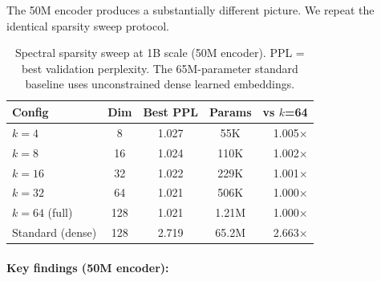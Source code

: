 \documentclass[10pt,twocolumn]{article}
\begin{document}
The 50M encoder produces a substantially different picture. We repeat the identical sparsity sweep protocol.

\begin{table}[t]
\centering
\caption{Spectral sparsity sweep at 1B scale (50M encoder). PPL = best validation perplexity. The 65M-parameter standard baseline uses unconstrained dense learned embeddings.}
\label{tab:1b_50m_sparsity}
\small
\begin{tabular}{@{}lcccr@{}}
\toprule
\textbf{Config} & \textbf{Dim} & \textbf{Best PPL} & \textbf{Params} & \textbf{vs $k$=64} \\
\midrule
$k = 4$            & 8   & 1.027 & 55K   & 1.005$\times$ \\
$k = 8$            & 16  & 1.024 & 110K  & 1.002$\times$ \\
$k = 16$           & 32  & 1.022 & 229K  & 1.001$\times$ \\
$k = 32$           & 64  & 1.021 & 506K  & 1.000$\times$ \\
$k = 64$ (full)    & 128 & 1.021 & 1.21M & 1.000$\times$ \\
\midrule
Standard (dense)   & 128 & 2.719 & 65.2M & 2.663$\times$ \\
\bottomrule
\end{tabular}
\end{table}

\paragraph{Key findings (50M encoder):}
\end{document}

